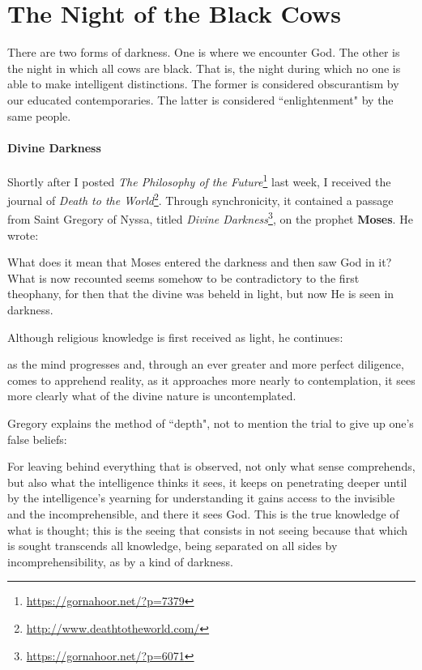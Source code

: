 \section{The Night of the Black Cows}

There are two forms of darkness. One is where we encounter God. The other is the night in which all cows are black. That is, the night during which no one is able to make intelligent distinctions. The former is considered obscurantism by our educated contemporaries. The latter is considered ``enlightenment" by the same people.

\paragraph{Divine Darkness}
Shortly after I posted \textit{The Philosophy of the Future}\footnote{\url{https://gornahoor.net/?p=7379}} last week, I received the journal of \textit{Death to the World}\footnote{\url{http://www.deathtotheworld.com/}}. Through synchronicity, it contained a passage from Saint Gregory of Nyssa, titled \emph{Divine Darkness}\footnote{\url{https://gornahoor.net/?p=6071}}, on the prophet \textbf{Moses}. He wrote:

\begin{quotex}
What does it mean that Moses entered the darkness and then saw God in it? What is now recounted seems somehow to be contradictory to the first theophany, for then that the divine was beheld in light, but now He is seen in darkness. 

\end{quotex}
Although religious knowledge is first received as light, he continues:

\begin{quotex}
as the mind progresses and, through an ever greater and more perfect diligence, comes to apprehend reality, as it approaches more nearly to contemplation, it sees more clearly what of the divine nature is uncontemplated. 

\end{quotex}
Gregory explains the method of ``depth", not to mention the trial to give up one's false beliefs:

\begin{quotex}
For leaving behind everything that is observed, not only what sense comprehends, but also what the intelligence thinks it sees, it keeps on penetrating deeper until by the intelligence's yearning for understanding it gains access to the invisible and the incomprehensible, and there it sees God. This is the true knowledge of what is thought; this is the seeing that consists in not seeing because that which is sought transcends all knowledge, being separated on all sides by incomprehensibility, as by a kind of darkness. 

\end{quotex}
